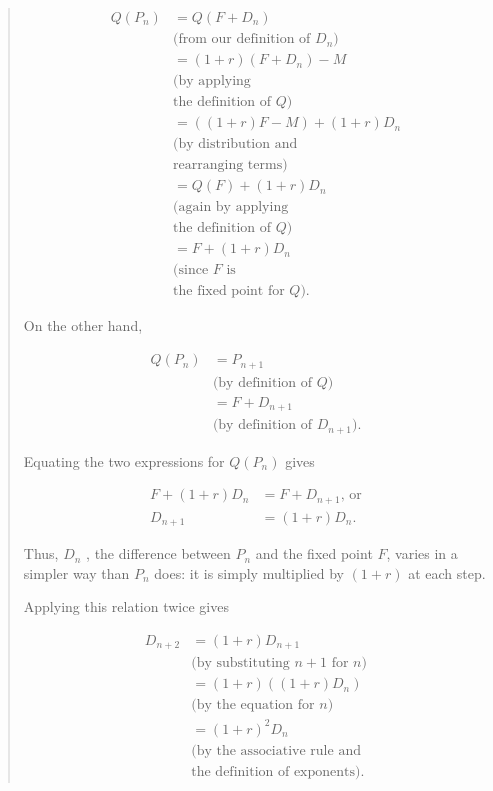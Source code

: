 \documentclass[
  10pt,
  a4paper,
  landscape,
  twoside,
  openany
]{scrbook}
\begin{document}
{\begin{quotation}
  \begin{align*}
    Q(P_n)
      &=Q(F+D_n) \\
        & \text{(from our definition of $D_n$)} \\
      &=(1+r)(F+D_n)-M \\
        & \text{(by applying} \\
        & \text{the definition of $Q$)} \\
      &=((1 + r)F - M) + (1 + r)D_n \\
        & \text{(by distribution and} \\
        & \text{rearranging terms)} \\
      &=Q(F) + (1 + r)D_n \\
        & \text{(again by applying} \\
        & \text{the definition of $Q$)} \\
      &=F + (1 + r)D_n \\
        & \text{(since $F$ is} \\
        & \text{the fixed point for $Q$).}
  \end{align*}

On the other hand,

  \begin{align*}
    Q(P_n)
      &=P_{n+1} \\
        & \text{(by definition of $Q$)} \\
      &=F + D_{n+1} \\
        & \text{(by definition of $D_{n+1}$).}
  \end{align*}

  Equating the two expressions for $Q(P_n)$ gives

  \begin{align*}
    F+(1+r)D_n&=F+D_{n+1}, \, \text{or} \\
    D_{n+1}&=(1+r)D_n.
  \end{align*}

  Thus, $D_n$ , the difference between $P_n$ and the fixed point $F$, varies in a simpler way than $P_n$ does: it is simply multiplied by $(1 + r)$ at each step.

  Applying this relation twice gives

  \begin{align*}
    D_{n+2}
      &=(1+r)D_{n+1} \\
        & \text{(by substituting $n + 1$ for $n$)} \\
      &=(1+r)((1+r)D_n) \\
        & \text{(by the equation for $n$)} \\
      &=(1+r)^2D_n \\
        & \text{(by the associative rule and} \\
        & \text{the definition of exponents).}
  \end{align*}


\end{quotation}}
\end{document}
